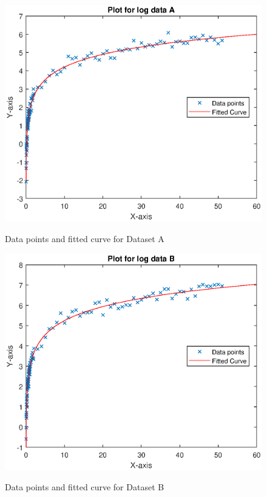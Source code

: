 \documentclass{article}
\begin{document}
\begin{figure}[!htb]
\centering
\includegraphics[scale=0.75]{Log_A.eps}
\label{plt:A}
\caption{Data points and fitted curve for Dataset A}
\includegraphics[scale=0.75]{Log_B.eps}
\label{plt:B}
\caption{Data points and fitted curve for Dataset B}
\end{figure}
\end{document}
